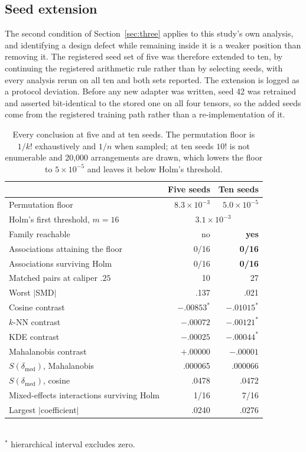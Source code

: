 \documentclass[11pt,a4paper]{article}
\begin{document}
\subsection{Seed extension}
\label{sec:seeds}
The second condition of Section~\ref{sec:three} applies to this study's own
analysis, and identifying a design defect while remaining inside it is a weaker
position than removing it. The registered seed set of five was therefore
extended to ten, by continuing the registered arithmetic rule rather than by
selecting seeds, with every analysis rerun on all ten and both sets reported.
The extension is logged as a protocol deviation. Before any new adapter was
written, seed 42 was retrained and asserted bit-identical to the stored one on
all four tensors, so the added seeds come from the registered training path
rather than a re-implementation of it.

\begin{table}[t]
\centering
\caption{Every conclusion at five and at ten seeds. The permutation floor is $1/k!$ exhaustively and $1/n$ when sampled; at ten seeds $10!$ is not enumerable and 20{,}000 arrangements are drawn, which lowers the floor to $5\times10^{-5}$ and leaves it below Holm's threshold.}
\label{tab:seeds}
\small
\begin{tabular}{lrr}
\toprule
& Five seeds & Ten seeds\\
\midrule
Permutation floor & $8.3\times10^{-3}$ & $5.0\times10^{-5}$\\
Holm's first threshold, $m{=}16$ & \multicolumn{2}{c}{$3.1\times10^{-3}$}\\
Family reachable & no & \textbf{yes}\\
Associations attaining the floor & 0/16 & \textbf{0/16}\\
Associations surviving Holm & 0/16 & \textbf{0/16}\\
\midrule
Matched pairs at caliper $.25$ & 10 & 27\\
Worst $|$SMD$|$ & .137 & .021\\
Cosine contrast & $-.00853^\ast$ & $-.01015^\ast$\\
$k$-NN contrast & $-.00072$ & $-.00121^\ast$\\
KDE contrast & $-.00025$ & $-.00044^\ast$\\
Mahalanobis contrast & $+.00000$ & $-.00001$\\
\midrule
$S(\delta_{\mathrm{med}})$, Mahalanobis & .000065 & .000066\\
$S(\delta_{\mathrm{med}})$, cosine & .0478 & .0472\\
Mixed-effects interactions surviving Holm & 1/16 & 7/16\\
Largest $|$coefficient$|$ & .0240 & .0276\\
\bottomrule
\end{tabular}
\\[2pt]
\footnotesize $^\ast$ hierarchical interval excludes zero.
\end{table}
\end{document}
